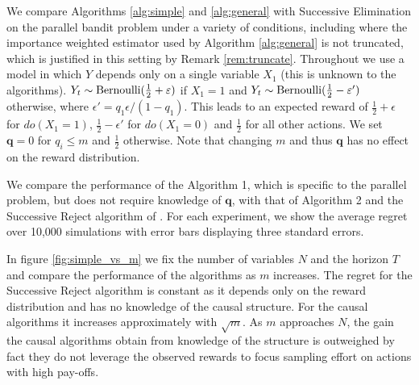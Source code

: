 We compare Algorithms \ref{alg:simple} and \ref{alg:general} with Successive Elimination on the parallel bandit problem
under a variety of conditions, including where the importance weighted estimator used by Algorithm \ref{alg:general} is not truncated,
which is justified in this setting by Remark \ref{rem:truncate}. Throughout we use a model in which $Y$ depends only on a single variable $X_1$ (this is unknown to the algorithms). $Y_t \sim \operatorname{Bernoulli}(\frac{1}{2}+\varepsilon)$ if $X_1=1$ and $Y_t \sim \operatorname{Bernoulli}(\frac{1}{2}-\varepsilon')$ otherwise, where $\epsilon' = q_1\epsilon/(1-q_1)$. This leads to an expected reward of $\frac{1}{2}+\epsilon$ for $do(X_1=1)$, $\frac{1}{2}-\epsilon'$ for $do(X_1=0)$ and $\frac{1}{2}$ for all other actions. We set $\boldsymbol{q} = 0$ for $q_i \leq m$ and $\frac{1}{2}$ otherwise. Note that changing $m$ and thus $\boldsymbol{q}$ has no effect on the reward distribution. 


We compare the performance of the Algorithm 1, which is specific to the parallel problem, but does not require knowledge of $\boldsymbol{q}$, with that of Algorithm 2 and the Successive Reject algorithm of \cite{audibert2010best}. For each experiment, we show the average regret over 10,000 simulations with error bars displaying three standard errors.

In figure \ref{fig:simple_vs_m} we fix the number of variables $N$ and the horizon $T$ and compare the performance of the algorithms as $m$ increases. The regret for the Successive Reject algorithm is constant as it depends only on the reward distribution and has no knowledge of the causal structure. For the causal algorithms it increases approximately with $\sqrt{m}$. As $m$ approaches $N$, the gain the causal algorithms obtain from knowledge of the structure is outweighed by fact they do not leverage the observed rewards to focus sampling effort on actions with high pay-offs.

